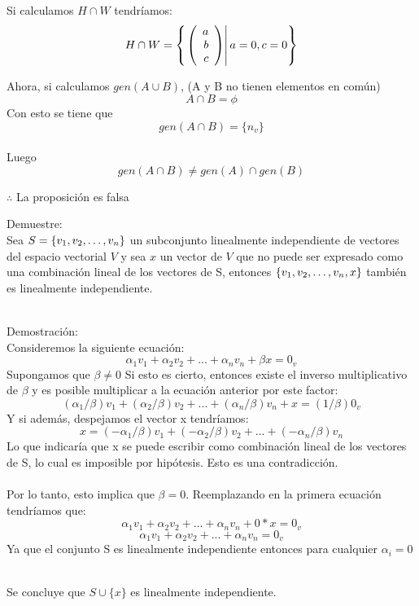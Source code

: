 \begin{enumerate}
Si calculamos $H\cap W$ tendríamos:
~\\
\[H\cap W=\left\{ \left. \left( \begin{array}{r} a\\ b\\ c \end{array} \right) \right| a=0, c=0 \right\}\]

Ahora, si calculamos $gen(A \cup B)$, (A y B no tienen elementos en común)~\\
\[A\cap B=\phi \]
Con esto se tiene que
\[gen(A\cap B)=\lbrace n_v \rbrace\]~\\
Luego
\[gen(A\cap B)\neq gen(A)\cap gen(B)\]

$\therefore$ La proposición es falsa
\newpage


\begin{prob}[]
Demuestre:
\\Sea $S= \lbrace v_1, v_2, \ldots, v_n \rbrace$ un subconjunto linealmente independiente de vectores del espacio vectorial $V$ y sea $x$ un vector de $V$ que no puede ser expresado como una combinación lineal de los vectores de S, entonces $ \left\{ v_1, v_2, \ldots, v_n, x \right\} $
también es linealmente independiente.
\end{prob}
~\\
\sol
Demostración:~\\
Consideremos la siguiente ecuación:
~\\
\[\alpha_1 v_1+\alpha_2 v_2+...+\alpha_n v_n+\beta x=0_v\]
Supongamos que $\beta\neq 0$
Si esto es cierto, entonces existe el inverso multiplicativo de $\beta$ y es posible multiplicar a la ecuación anterior por este factor:~\\
\[(\alpha_1/\beta) v_1+(\alpha_2/\beta) v_2+...+(\alpha_n/\beta) v_n+ x=(1/\beta)0_v\]
Y si además, despejamos el vector x tendríamos:
\[x=(-\alpha_1/\beta) v_1+(-\alpha_2/\beta) v_2+...+(-\alpha_n/\beta) v_n\]
Lo que indicaría que x se puede escribir como combinación lineal de los vectores de S, lo cual es imposible por hipótesis. Esto es una contradicción.
~\\
~\\
Por lo tanto, esto implica que $\beta=0$. Reemplazando en la primera ecuación tendríamos que:
\[\alpha_1 v_1+\alpha_2 v_2+...+\alpha_n v_n+0*x=0_v\]
\[\alpha_1 v_1+\alpha_2 v_2+...+\alpha_n v_n=0_v\]
Ya que el conjunto S es linealmente independiente entonces para cualquier $\alpha_i=0$

~\\
Se concluye que $S\cup \lbrace x\rbrace$ es linealmente independiente.



\newpage

%


\end{enumerate}
